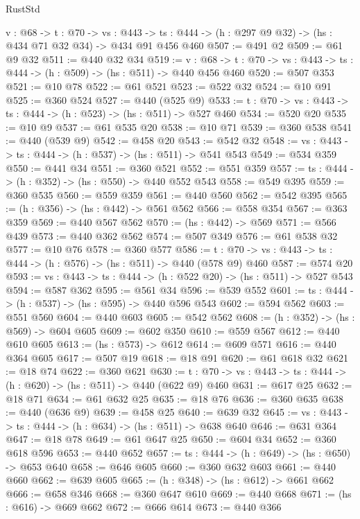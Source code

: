 \begin{lexlean}{RustStd}
\begin{coremodule}
{\begin{coremodule}
  {v : @68} ->
  {t : @70} ->
  {vs : @443} -> {ts : @444} -> (h : @297 @9 @32) -> (hs : @434 @71 @32 @34) -> @434 @91 @456 @460
@507 := @491 @2
@509 := @61 @9 @32
@511 := @440 @32 @34
@519 := {v : @68} ->
  {t : @70} -> {vs : @443} -> {ts : @444} -> (h : @509) -> (hs : @511) -> @440 @456 @460
@520 := @507 @353
@521 := @10 @78
@522 := @61 @521
@523 := @522 @32
@524 := @10 @91
@525 := @360 @524
@527 := @440 (@525 @9)
@533 := {t : @70} -> {vs : @443} -> {ts : @444} -> (h : @523) -> (hs : @511) -> @527 @460
@534 := @520 @20
@535 := @10 @9
@537 := @61 @535 @20
@538 := @10 @71
@539 := @360 @538
@541 := @440 (@539 @9)
@542 := @458 @20
@543 := @542 @32
@548 := {vs : @443} -> {ts : @444} -> (h : @537) -> (hs : @511) -> @541 @543
@549 := @534 @359
@550 := @441 @34
@551 := @360 @521
@552 := @551 @359
@557 := {ts : @444} -> (h : @352) -> (hs : @550) -> @440 @552 @543
@558 := @549 @395
@559 := @360 @535
@560 := @559 @359
@561 := @440 @560
@562 := @542 @395
@565 := (h : @356) -> (hs : @442) -> @561 @562
@566 := @558 @354
@567 := @363 @359
@569 := @440 @567 @562
@570 := (hs : @442) -> @569
@571 := @566 @439
@573 := @440 @362 @562
@574 := @507 @349
@576 := @61 @538 @32
@577 := @10 @76
@578 := @360 @577
@586 := {t : @70} -> {vs : @443} -> {ts : @444} -> (h : @576) -> (hs : @511) -> @440 (@578 @9) @460
@587 := @574 @20
@593 := {vs : @443} -> {ts : @444} -> (h : @522 @20) -> (hs : @511) -> @527 @543
@594 := @587 @362
@595 := @561 @34
@596 := @539 @552
@601 := {ts : @444} -> (h : @537) -> (hs : @595) -> @440 @596 @543
@602 := @594 @562
@603 := @551 @560
@604 := @440 @603
@605 := @542 @562
@608 := (h : @352) -> (hs : @569) -> @604 @605
@609 := @602 @350
@610 := @559 @567
@612 := @440 @610 @605
@613 := (hs : @573) -> @612
@614 := @609 @571
@616 := @440 @364 @605
@617 := @507 @19
@618 := @18 @91
@620 := @61 @618 @32
@621 := @18 @74
@622 := @360 @621
@630 := {t : @70} -> {vs : @443} -> {ts : @444} -> (h : @620) -> (hs : @511) -> @440 (@622 @9) @460
@631 := @617 @25
@632 := @18 @71
@634 := @61 @632 @25
@635 := @18 @76
@636 := @360 @635
@638 := @440 (@636 @9)
@639 := @458 @25
@640 := @639 @32
@645 := {vs : @443} -> {ts : @444} -> (h : @634) -> (hs : @511) -> @638 @640
@646 := @631 @364
@647 := @18 @78
@649 := @61 @647 @25
@650 := @604 @34
@652 := @360 @618 @596
@653 := @440 @652
@657 := {ts : @444} -> (h : @649) -> (hs : @650) -> @653 @640
@658 := @646 @605
@660 := @360 @632 @603
@661 := @440 @660
@662 := @639 @605
@665 := (h : @348) -> (hs : @612) -> @661 @662
@666 := @658 @346
@668 := @360 @647 @610
@669 := @440 @668
@671 := (hs : @616) -> @669 @662
@672 := @666 @614
@673 := @440 @366

\end{coremodule}}
\end{coremodule}
\end{lexlean}
